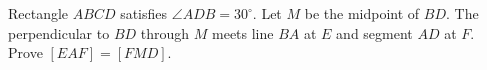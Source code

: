 Rectangle $ABCD$ satisfies $\angle ADB=30^\circ$. Let $M$ be the midpoint of $BD$. The perpendicular to $BD$ through $M$ meets line $BA$ at $E$ and segment $AD$ at $F$. Prove $[EAF]=[FMD]$.
